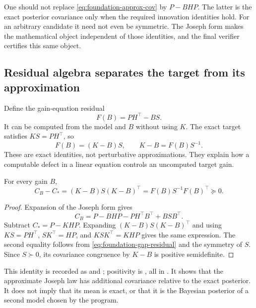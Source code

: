 One should not replace \eqref{eq:foundation-approx-cov} by $P-BHP$. The latter is the exact posterior covariance only when the required innovation identities hold. For an arbitrary candidate it need not even be symmetric. The Joseph form makes the mathematical object independent of those identities, and the final verifier certifies this same object.

\subsection{Residual algebra separates the target from its approximation}

Define the gain-equation residual
\begin{equation}
 F(B)=PH^\top-BS.
 \label{eq:foundation-residual}
\end{equation}
It can be computed from the model and $B$ without using $K$. The exact target satisfies $KS=PH^\top$, so
\begin{equation}
 F(B)=(K-B)S,\qquad K-B=F(B)S^{-1}.
 \label{eq:foundation-gap-residual}
\end{equation}
These are exact identities, not perturbative approximations. They explain how a computable defect in a linear equation controls an uncomputed target gain.

\begin{proposition}
\label{prop:foundation-excess-cov}
For every gain $B$,
\begin{equation}
 C_B-C_*=(K-B)S(K-B)^\top
          =F(B)S^{-1}F(B)^\top\succeq0.
 \label{eq:foundation-excess-cov}
\end{equation}
\end{proposition}
\begin{proof}
Expansion of the Joseph form gives
\[
 C_B=P-BHP-PH^\top B^\top+BSB^\top.
\]
Subtract $C_*=P-KHP$. Expanding $(K-B)S(K-B)^\top$ and using $KS=PH^\top$, $SK^\top=HP$, and $KSK^\top=KHP$ gives the same expression. The second equality follows from \eqref{eq:foundation-gap-residual} and the symmetry of $S$. Since $S\succ0$, its covariance congruence by $K-B$ is positive semidefinite.
\end{proof}

This identity is recorded as  and ; positivity is , all in . It shows that the approximate Joseph law has additional covariance relative to the exact posterior. It does not imply that its mean is exact, or that it is the Bayesian posterior of a second model chosen by the program.

